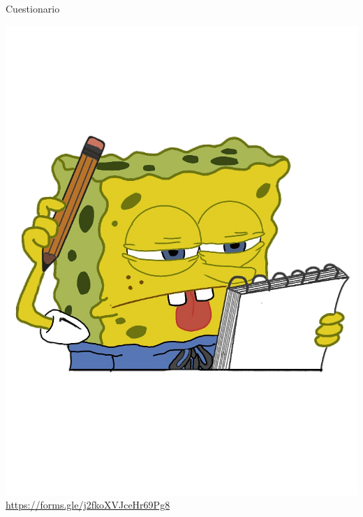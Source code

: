 \documentclass[10pt,xcolor={dvipsnames}]{beamer}
\begin{document}
\begin{frame}{Cuestionario}
\begin{center}
\includegraphics[scale=0.18]{Figures/BobS} \pause
\url{https://forms.gle/j2fkoXVJceHr69Pg8}
\end{center}
\end{frame}


{\1
\begin{frame}
\end{frame}}
\end{document}
